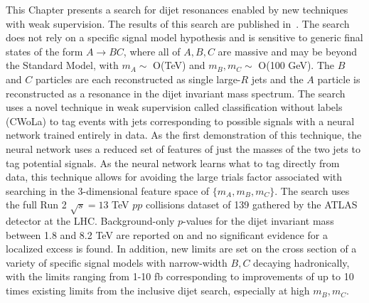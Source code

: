 This Chapter presents a search for dijet resonances enabled by new techniques with weak supervision.
The results of this search are published in~\cite{Aad:2020cws}.
The search does not rely on a specific signal model hypothesis and is sensitive to generic final states of the form $A\rightarrow BC$, where all of $A,B,C$ are massive and may be beyond the Standard Model, with $m_A\sim$ O(TeV) and $m_B,m_C\sim$ O(100 GeV).
The $B$ and $C$ particles are each reconstructed as single large-$R$ jets and the $A$ particle is reconstructed as a resonance in the dijet invariant mass spectrum.
The search uses a novel technique in weak supervision called classification without labels (CWoLa) to tag events with jets corresponding to possible signals with a neural network trained entirely in data.
As the first demonstration of this technique, the neural network uses a reduced set of features of just the masses of the two jets to tag potential signals.
As the neural network learns what to tag directly from data, this technique allows for avoiding the large trials factor associated with searching in the 3-dimensional feature space of $\{m_A,m_B,m_C\}$.
The search uses the full Run 2 $\sqrt{s}=13$ TeV $pp$ collisions dataset of 139\ifb{} gathered by the ATLAS detector at the LHC.
Background-only $p$-values for the dijet invariant mass between 1.8 and 8.2 TeV are reported on and no significant evidence for a localized excess is found.
In addition, new limits are set on the cross section of a variety of specific signal models with narrow-width $B,C$ decaying hadronically, with the limits ranging from 1-10 fb corresponding to improvements of up to 10 times existing limits from the inclusive dijet search, especially at high $m_B,m_C$.

